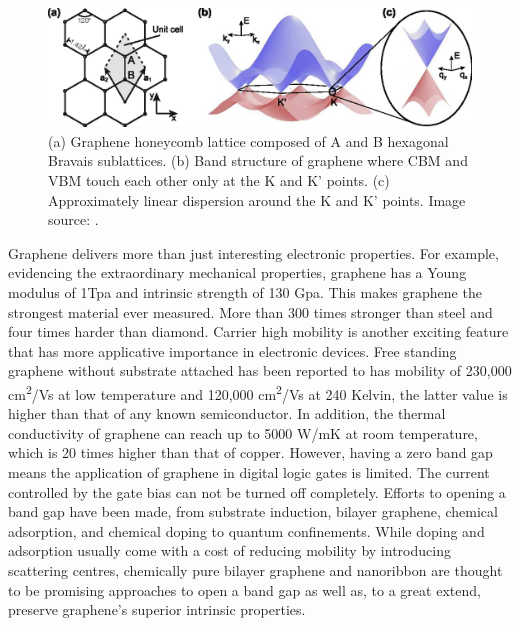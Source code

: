 \begin{figure}[htbp!] 
\centering  
\includegraphics[width=\textwidth]{gra_lat_band.eps}
\caption[Graphene lattice and band structure.]{(a) Graphene honeycomb lattice composed of A and B hexagonal Bravais sublattices. (b) Band structure of graphene where CBM and VBM touch each other only at the K and K' points. (c) Approximately linear dispersion around the K and K' points. Image source: \cite{Guttinger2012}. }  
\label{fig:gra_band}
\end{figure} 

Graphene delivers more than just interesting electronic properties. For example, evidencing the extraordinary mechanical properties, graphene has a Young modulus of 1Tpa and intrinsic strength of 130 Gpa\cite{Lee385}. This makes graphene the strongest material ever measured. More than 300 times stronger than steel and four times harder than diamond. Carrier high mobility is another exciting feature that has more applicative importance in electronic devices. Free standing graphene without substrate attached has been reported to has mobility of 230,000 \si{cm^2/Vs} at low temperature\cite{Bolotin2008a} and 120,000 \si{cm^2/Vs} at 240 Kelvin, the latter value is higher than that of any known semiconductor\cite{Bolotin2008b}. In addition, the thermal conductivity of graphene can reach up to 5000 \si{W/mK} at room temperature, which is 20 times higher than that of copper\cite{balandin2008}. However, having a zero band gap means the application of graphene in digital logic gates is limited. The current controlled by the gate bias can not be turned off completely. Efforts to opening a band gap have been made, from substrate induction\cite{Ci2010,zhou2007}, bilayer graphene\cite{mccann2006,castro2007}, chemical adsorption\cite{Elias2009,Jeon2011}, and chemical doping\cite{zhou2008} to quantum confinements\cite{Nakada1996,Barone2006}.  While doping and adsorption usually come with a cost of reducing mobility by introducing scattering centres, chemically pure bilayer graphene and nanoribbon are thought to be promising approaches to open a band gap as well as, to a great extend, preserve graphene's superior intrinsic properties.

